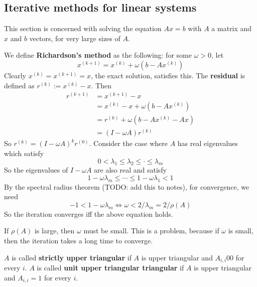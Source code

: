 \subsection{Iterative methods for linear systems}

This section is concerned with solving the equation $Ax = b$ with $A$ a matrix and $x$ and $b$ vectors, for very large sizes of $A$.

\begin{definition}
	We define \textbf{Richardson's method} as the following: for some $\omega > 0$, let
	\[
		x^{(k+1)} = x^{(k)} + \omega (b - Ax^{(k)})
	\]
	Clearly $x^{(k)} = x^{(k + 1)} = x$, the exact solution, satisfies this. The \textbf{residual} is defined as $r^{(k)} := x^{(k)} - x$. Then
	\[
		\begin{aligned}
			r^{(k + 1)}
				& = x^{(k + 1)} - x \\
				& = x^{(k)} - x + \omega (b - Ax^{(k)}) \\
				& = r^{(k)} + \omega (b - Ax^{(k)} - Ax) \\
				& = (I - \omega A) r^{(k)}
		\end{aligned}
	\]
	So $r^{(k)} = {(I - \omega A)}^k r^{(0)}$. Consider the case where $A$ has real eigenvalues which satisfy
	\[
		0 < \lambda_1 \le \lambda_2 \le \cdot \le \lambda_m
	\]
	So the eigenvalues of $I - \omega A$ are also real and satisfy
	\[
		1 - \omega \lambda_m \le \cdots \le 1 - \omega \lambda_1 < 1
	\]
	By the spectral radius theorem (TODO: add this to notes), for convergence, we need
	\[
		-1 < 1 - \omega \lambda_m \Longleftrightarrow \omega < 2 / \lambda_m = 2 / \rho(A)
	\]
	So the iteration converges iff the above equation holds.
\end{definition}

\begin{remark}
	If $\rho(A)$ is large, then $\omega$ must be small. This is a problem, because if $\omega$ is small, then the iteration takes a long time to converge.
\end{remark}

\begin{definition}
	$A$ is called \textbf{strictly upper triangular} if $A$ is upper triangular and $A_{i, i} 0 0$ for every $i$. $A$ is called \textbf{unit upper triangular triangular} if $A$ is upper triangular and $A_{i, i} = 1$ for every $i$.
\end{definition}

